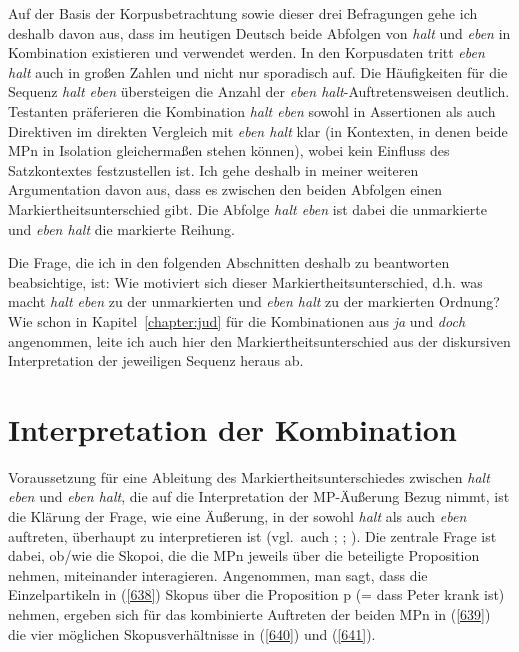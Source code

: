 \noindent
Auf der Basis der Korpusbetrachtung sowie dieser drei Befragungen gehe ich deshalb davon aus, dass im heutigen Deutsch beide Abfolgen von \textit{halt} und \textit{eben} in Kombination existieren und verwendet werden. In den Korpusdaten tritt \textit{eben halt} auch in großen Zahlen und nicht nur sporadisch auf. Die Häufigkeiten für die Sequenz \textit{halt eben} übersteigen die Anzahl der \textit{eben halt}-Auftretensweisen deutlich. Testanten präferieren die Kombination \textit{halt eben} sowohl in Assertionen als auch Direktiven im direkten Vergleich mit \textit{eben halt} klar (in Kontexten, in denen beide MPn in Isolation gleichermaßen stehen können), wobei kein Einfluss des Satzkontextes festzustellen ist. Ich gehe deshalb in meiner weiteren Argumentation davon aus, dass es zwischen den beiden Abfolgen einen Markiertheits\-unterschied gibt. Die Abfolge \textit{halt eben} ist dabei die unmarkierte und \textit{eben halt} die markierte Reihung.

Die Frage, die ich in den folgenden Abschnitten deshalb zu beantworten beabsichtige, ist: Wie motiviert sich dieser Markiertheitsunterschied, d.h. was macht \textit{halt eben} zu der unmarkierten und \textit{eben halt} zu der markierten Ordnung? Wie schon in Kapitel~\ref{chapter:jud} für die Kombinationen aus \textit{ja} und \textit{doch} angenommen, leite ich auch hier den Markiertheitsunterschied aus der diskursiven Interpretation der jeweiligen Sequenz heraus ab.

\section{Interpretation der Kombination}
\label{sec:interpretationkombi}
Voraussetzung für eine Ableitung des Markiertheitsunterschiedes zwischen \textit{halt eben} und \textit{eben halt}, die auf die Interpretation der MP-Äußerung Bezug nimmt, ist die Klärung der Frage, wie eine Äußerung, in der sowohl \textit{halt} als auch \textit{eben} auftreten, überhaupt zu interpretieren ist (vgl.\ auch \citealt[159--161]{Mueller2016a}; \citeyear[169--172]{Mueller2016b}; \citeyear[243--244]{Mueller2017a}). Die zentrale Frage ist dabei, ob/wie die Skopoi, die die MPn jeweils über die beteiligte Proposition nehmen, miteinander interagieren. Angenommen, man sagt, dass die Einzelpartikeln in (\ref{638}) Skopus über die Proposition p (= dass Peter krank ist) nehmen, ergeben sich für das kombinierte Auftreten der beiden MPn in (\ref{639}) die vier möglichen Skopusverhältnisse in (\ref{640}) und (\ref{641}).

